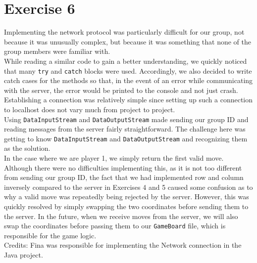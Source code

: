 \section{Exercise 6}
Implementing the network protocol was particularly difficult for our group, not because it was unusually complex, but because it was something that none of the group members were familiar with.\\
While reading a similar code to gain a better understanding, we quickly noticed that many \texttt{try} and \texttt{catch} blocks were used. Accordingly, we also decided to write catch cases for the methods so that, in the event of an error while communicating with the server, the error would be printed to the console and not just crash.\\
Establishing a connection was relatively simple since setting up such a connection to localhost does not vary much from project to project.\\
Using \texttt{DataInputStream} and \texttt{DataOutputStream} made sending our group ID and reading messages from the server fairly straightforward. The challenge here was getting to know \texttt{DataInputStream} and \texttt{DataOutputStream} and recognizing them as the solution.\\
In the case where we are player 1, we simply return the first valid move. Although there were no difficulties implementing this, as it is not too different from sending our group ID, the fact that we had implemented row and column inversely compared to the server in Exercises 4 and 5 caused some confusion as to why a valid move was repeatedly being rejected by the server. However, this was quickly resolved by simply swapping the two coordinates before sending them to the server. In the future, when we receive moves from the server, we will also swap the coordinates before passing them to our \texttt{GameBoard} file, which is responsible for the game logic.\\
Credits: Fina was responsible for implementing the Network connection in the Java project.